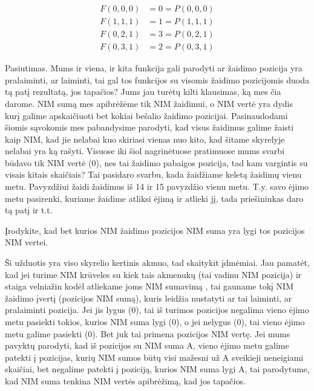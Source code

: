 \begin{align*}
F(0,0,0)&=0=P(0,0,0) \\
F(1,1,1)&=1=P(1,1,1) \\
F(0,2,1)&=3=P(0,2,1) \\
F(0,3,1)&=2=P(0,3,1)
\end{align*}

Pasiutimas. Mums ir viena, ir kita funkcija gali parodyti ar žaidimo pozicija
yra pralaiminti, ar laiminti, tai gal tos funkcijos su visomis žaidimo
pozicijomis duoda tą patį rezultatą, jos tapačios? Jums jau turėtų kilti
klausimas, ką mes čia darome. NIM sumą mes apibrėžėme tik NIM žaidimui, o NIM
vertė yra dydis kurį galime apskaičiuoti bet kokiai bešalio žaidimo pozicijai.
Pasinaudodami šiomis sąvokomis mes pabandysime parodyti, kad visus žaidimus
galime žaisti kaip NIM, kad jie nelabai kuo skiriasi vienas nuo kito, kad
šitame skyrelyje nelabai yra ką rašyti. Visuose iki šiol nagrinėtuose
pratimuose mums svarbi būdavo tik NIM vertė (0), nes tai žaidimo pabaigos
pozicija, tad kam vargintis su visais kitais skaičiais? Tai pasidaro svarbu,
kada žaidžiame keletą žaidimų vienu metu. Pavyzdžiui žaidi žaidimus iš 14 ir 15
pavyzdžio vienu metu. T.y. savo ėjimo metu pasirenki, kuriame žaidime atliksi
ėjimą ir atlieki jį, tada priešininkas daro tą  patį ir t.t.


\begin{pavnr} 
  Įrodykite, kad bet kurios NIM žaidimo pozicijos NIM suma yra lygi tos
  pozicijos NIM vertei.
\end{pavnr}

Ši užduotis yra viso skyrelio kertinis akmuo, tad skaitykit įdmėmiai. Jau
pamatėt, kad jei turime NIM krūveles su kiek tais akmenukų (tai vadinu NIM
pozicija) ir staiga velniažin kodėl atliekame joms NIM sumavimą , tai gauname
tokį NIM žaidimo įvertį (pozicijos NIM sumą), kuris leidžia nustatyti ar tai
laiminti, ar pralaiminti pozicija. Jei jis lygus (0), tai iš turimos pozicijos
negalima vieno ėjimo metu pasiekti tokios, kurios NIM suma lygi (0), o jei
nelygus (0), tai vieno ėjimo metu galime pasiekti (0). Bet juk tai primena
pozicijos NIM vertę. Jei mums pavyktų parodyti, kad iš pozicijos su NIM suma A,
vieno ėjimo metu galime patekti į pozicijas, kurių NIM sumos būtų visi mažesni
už A sveikieji neneigiami skaičiai, bet negalime patekti į poziciją, kurios NIM
suma lygi A, tai parodytume, kad NIM suma tenkina NIM vertės apibrėžimą, kad
jos tapačios.


